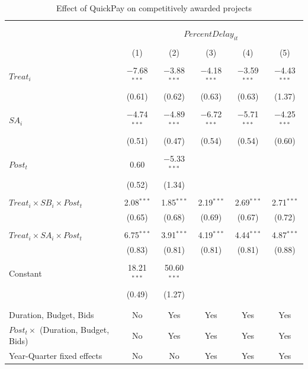 \documentclass[
]{article}
\begin{document}
\begin{table}[H] \centering 
  \caption{Effect of QuickPay on competitively awarded projects} 
  \label{} 
\small 
\begin{tabular}{@{\extracolsep{-2pt}}lccccc} 
\\[-1.8ex]\hline 
\hline \\[-1.8ex] 
\\[-1.8ex] & \multicolumn{5}{c}{$PercentDelay_{it}$  } \\ 
\\[-1.8ex] & (1) & (2) & (3) & (4) & (5)\\ 
\hline \\[-1.8ex] 
 $Treat_i$ & $-$7.68$^{***}$ & $-$3.88$^{***}$ & $-$4.18$^{***}$ & $-$3.59$^{***}$ & $-$4.43$^{***}$ \\ 
  & (0.61) & (0.62) & (0.63) & (0.63) & (1.37) \\ 
  & & & & & \\ 
 $SA_i$ & $-$4.74$^{***}$ & $-$4.89$^{***}$ & $-$6.72$^{***}$ & $-$5.71$^{***}$ & $-$4.25$^{***}$ \\ 
  & (0.51) & (0.47) & (0.54) & (0.54) & (0.60) \\ 
  & & & & & \\ 
 $Post_t$ & 0.60 & $-$5.33$^{***}$ &  &  &  \\ 
  & (0.52) & (1.34) &  &  &  \\ 
  & & & & & \\ 
 $Treat_i \times SB_i \times Post_t$ & 2.08$^{***}$ & 1.85$^{***}$ & 2.19$^{***}$ & 2.69$^{***}$ & 2.71$^{***}$ \\ 
  & (0.65) & (0.68) & (0.69) & (0.67) & (0.72) \\ 
  & & & & & \\ 
 $Treat_i \times SA_i \times Post_t$ & 6.75$^{***}$ & 3.91$^{***}$ & 4.19$^{***}$ & 4.44$^{***}$ & 4.87$^{***}$ \\ 
  & (0.83) & (0.81) & (0.81) & (0.81) & (0.88) \\ 
  & & & & & \\ 
 Constant & 18.21$^{***}$ & 50.60$^{***}$ &  &  &  \\ 
  & (0.49) & (1.27) &  &  &  \\ 
  & & & & & \\ 
\hline \\[-1.8ex] 
Duration, Budget, Bids & No & Yes & Yes & Yes & Yes \\ 
$Post_t \times $  (Duration, Budget, Bids) & No & Yes & Yes & Yes & Yes \\ 
Year-Quarter fixed effects & No & No & Yes & Yes & Yes \\ 

\end{tabular}
\end{table}
\end{document}

